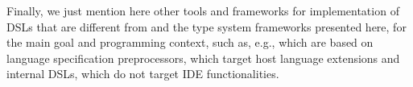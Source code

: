 
Finally, we just mention here other tools and frameworks for implementation of
DSLs that are different from \xtext{} and the type system frameworks presented
here, for the main goal and programming context, such as, e.g.,
\cite{JST98,MetaBorg06,MontiCore10} which are based on language specification
preprocessors, \cite{XMF08,LanguageBoxes09} which target host language
extensions and internal DSLs, \cite{ASFSDF,Ruler,PLTRedex} which do not target
IDE functionalities.